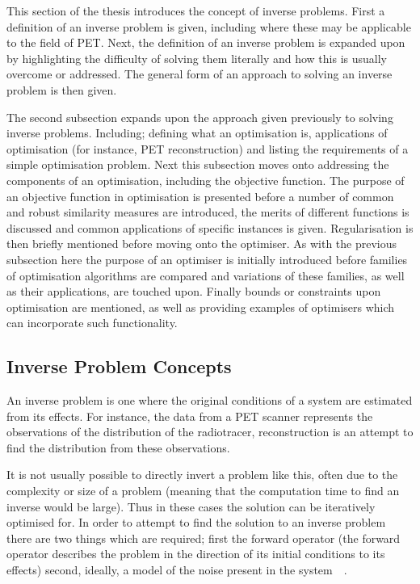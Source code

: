         This section of the thesis introduces the concept of inverse problems. First a definition of an inverse problem is given, including where these may be applicable to the field of \gls{PET}. Next, the definition of an inverse problem is expanded upon by highlighting the difficulty of solving them literally and how this is usually overcome or addressed. The general form of an approach to solving an inverse problem is then given.
            
        The second subsection expands upon the approach given previously to solving inverse problems. Including; defining what an optimisation is, applications of optimisation (for instance, \gls{PET} reconstruction) and listing the requirements of a simple optimisation problem. Next this subsection moves onto addressing the components of an optimisation, including the objective function. The purpose of an objective function in optimisation is presented before a number of common and robust similarity measures are introduced, the merits of different functions is discussed and common applications of specific instances is given. Regularisation is then briefly mentioned before moving onto the optimiser. As with the previous subsection here the purpose of an optimiser is initially introduced before families of optimisation algorithms are compared and variations of these families, as well as their applications, are touched upon. Finally bounds or constraints upon optimisation are mentioned, as well as providing examples of optimisers which can incorporate such functionality.
        
        \subsection{Inverse Problem Concepts} \label{sec:inverse_problem_concepts}
            An inverse problem is one where the original conditions of a system are estimated from its effects. For instance, the data from a \gls{PET} scanner represents the observations of the distribution of the radiotracer, reconstruction is an attempt to find the distribution from these observations.
            
            It is not usually possible to directly invert a problem like this, often due to the complexity or size of a problem (meaning that  the computation time to find an inverse would be large). Thus in these cases the solution can be iteratively optimised for. In order to attempt to find the solution to an inverse problem there are two things which are required; first the forward operator (the forward operator describes the problem in the direction of its initial conditions to its effects) %
            second, ideally, a model of the noise present in the system~~. %
        
